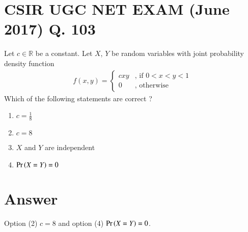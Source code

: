 \documentclass[journal,12pt,twocolumn]{IEEEtran}
\begin{document}
\section*{CSIR UGC NET EXAM (June 2017) Q. 103}
Let $ c \in \mathbb{R} $ be a constant. Let $ X$, $Y$ be random variables with joint probability density function 
\begin{align*}
f(x,y)  = 
\begin{cases}
cxy & \text{, if } 0<x<y<1
\\
0 & \text{, otherwise }
\end{cases}
\end{align*}
Which of the following statements are correct ?
\begin{enumerate}
    \item $c = \frac{1}{8}$
    \item $ c= 8$
    \item $X $ and $ Y$ are independent
    \item $\Pr\left(X= Y\right) = 0 $
\end{enumerate}
\section*{Answer}
Option (2) $ c= 8$ and option (4) $\Pr\left(X= Y\right) = 0 $.
\end{document}
